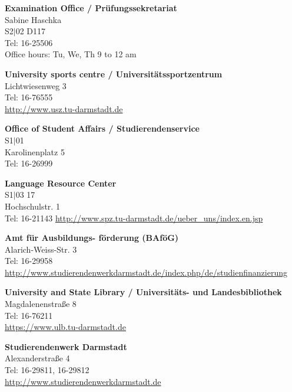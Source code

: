 \begin{multicols}{2}
    \vspace{3mm}
    \textbf{Examination Office / Prüfungssekretariat}\\
    Sabine Haschka\\
    S2$|$02 D117\\
    Tel: 16-25506\\
    Office hours: Tu, We, Th 9 to 12 am

    \vspace{3mm}
    \textbf{University sports centre / Universitätssportzentrum}\\
    Lichtwiesenweg 3\\
    Tel: 16-76555\\
    \url{http://www.usz.tu-darmstadt.de}

    \vspace{3mm}
    \textbf{Office of Student Affairs / Studierendenservice}\\
    S1$|$01\\
    Karolinenplatz 5\\
    Tel: 16-26999

    \vspace{3mm}
    \textbf{Language Resource Center}\\
    S1$|$03 17\\
    Hochschulstr. 1\\
    Tel: 16-21143
    \url{http://www.spz.tu-darmstadt.de/ueber_uns/index.en.jsp}

    \vspace{3mm}
    \textbf{Amt für Ausbildungs- förderung (BAföG)}\\
    Alarich-Weiss-Str. 3 \\
    Tel: 16-29958\\
    \url{http://www.studierendenwerkdarmstadt.de/index.php/de/studienfinanzierung}

    \vspace{3mm}
    \textbf{University and State Library / Universitäts- und Landesbibliothek}\\
    Magdalenenstraße 8\\
    Tel: 16-76211\\
    \url{https://www.ulb.tu-darmstadt.de}

    \vspace{3mm}
    \textbf{Studierendenwerk Darmstadt}\\
    Alexanderstraße 4 \\
    Tel: 16-29811, 16-29812\\
    \url{http://www.studierendenwerkdarmstadt.de}


\end{multicols}

\newpage
